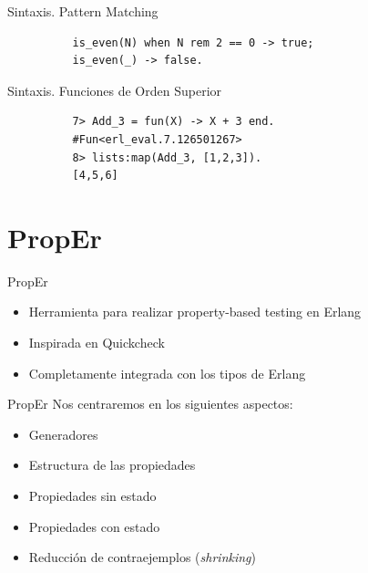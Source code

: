 \documentclass{beamer}
\begin{document}
      \begin{frame}[fragile]{Sintaxis. Pattern Matching}
        \begin{verbatim}
          is_even(N) when N rem 2 == 0 -> true;
          is_even(_) -> false.
        \end{verbatim}
      \end{frame}

      \begin{frame}[fragile]{Sintaxis. Funciones de Orden Superior}
        \begin{verbatim}
          7> Add_3 = fun(X) -> X + 3 end.
          #Fun<erl_eval.7.126501267>
          8> lists:map(Add_3, [1,2,3]).
          [4,5,6]
        \end{verbatim}
      \end{frame}

  \section{PropEr}
    \begin{frame}{PropEr}
      \begin{itemize}
        \item Herramienta para realizar property-based testing en Erlang
        \item Inspirada en Quickcheck
        \item Completamente integrada con los tipos de Erlang
      \end{itemize}
    \end{frame}

    \begin{frame}{PropEr}
      Nos centraremos en los siguientes aspectos:
      \begin{itemize}
        \item Generadores
        \item Estructura de las propiedades
        \item Propiedades sin estado
        \item Propiedades con estado
        \item Reducción de contraejemplos (\textit{shrinking})
      \end{itemize}
    \end{frame}
\end{document}
